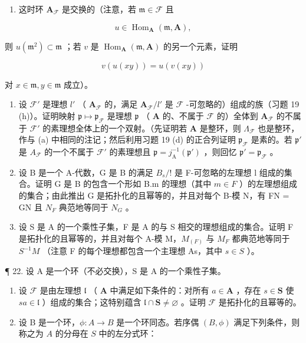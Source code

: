 \begin{enumerate}
\def\labelenumi{(\alph{enumi})}
\tightlist
\item
  这时环 \(\mathbf{A}_{\mathcal{F}}\) 是交换的（注意，若 \(\mathfrak{m} \in \mathcal{F}\) 且
\end{enumerate}

\[
u \in \operatorname{Hom} _ {\mathbf {A}} (\mathfrak {m}, \mathbf {A}),
\]

则 \(u(\mathfrak{m}^2) \subset \mathfrak{m}\) ；若 \(v\) 是 \(\operatorname{Hom}_{\mathbf{A}}(\mathfrak{m}, \mathbf{A})\) 的另一个元素，证明

\[
v (u (x y)) = u (v (x y))
\]

对 \(x \in \mathfrak{m}, y \in \mathfrak{m}\) 成立）。

\begin{enumerate}
\def\labelenumi{(\alph{enumi})}
\setcounter{enumi}{1}
\item
  设 \(\mathcal{F}'\) 是理想 \(l'\) （ \(\mathbf{A}_{\mathcal{F}}\) 的，满足 \(\mathbf{A}_{\mathcal{F}} / l'\) 是 \(\mathcal{F}\) -可忽略的）组成的族（习题 19 (h)）。证明映射 \(\mathfrak{p} \mapsto \mathfrak{p}_{\mathcal{F}}\) 是理想 \(\mathfrak{p}\) （ \(\mathbf{A}\) 的、不属于 \(\mathcal{F}\) 的）全体到 \(\mathbf{A}_{\mathcal{F}}\) 的不属于 \(\mathcal{F}'\) 的素理想全体上的一个双射。（先证明若 \(\mathbf{A}\) 是整环，则 \(\Lambda_{\mathcal{F}}\) 也是整环，作与 (a) 中相同的注记；然后利用习题 19 (d) 的正合列证明 \(\mathfrak{p}_{\mathcal{F}}\) 是素的。若 \(\mathfrak{p}'\) 是 \(A_{\mathcal{F}}\) 的一个不属于 \(\mathcal{F}'\) 的素理想且 \(\mathfrak{p} = j_{\mathrm{A}}^{-1}(\mathfrak{p}')\) ，则回忆 \(\mathfrak{p}' = \mathfrak{p}_{\mathcal{F}}\) 。
\item
  设 B 是一个 A-代数，G 是 B 的满足 \(B_{s}/!\) 是 F-可忽略的左理想 l 组成的集合。证明 G 是 B 的包含一个形如 B.m 的理想（其中 \(m \in F\) ）的左理想组成的集合；由此推出 G 是拓扑化的且幂等的，并且对每个 B-模 N，有 FN = GN 且 \(N_{F}\) 典范地等同于 \(N_{G}\) 。
\item
  设 S 是 A 的一个乘性子集，F 是 A 的与 S 相交的理想组成的集合。证明 F 是拓扑化的且幂等的，并且对每个 A-模 M，\(M_{(F)}\) 与 \(M_{F}\) 都典范地等同于 \(S^{-1}M\) （注意 F 的每个理想都包含一个主理想 As，其中 \(s \in S\) ）。
\end{enumerate}

¶ 22. 设 A 是一个环（不必交换），S 是 A 的一个乘性子集。

\begin{enumerate}
\def\labelenumi{(\alph{enumi})}
\item
  设 \(\mathcal{F}\) 是由左理想 \(\mathfrak{l}\) （ \(\mathbf{A}\) 中满足如下条件的：对所有 \(a\in \mathbf{A}\) ，存在 \(s\in \mathbf{S}\) 使 \(sa\in \mathfrak{l}\) ）组成的集合；这特别蕴含 \(\mathfrak{l}\cap \mathbf{S}\neq \varnothing\) 。证明 \(\mathcal{F}\) 是拓扑化的且幂等的。
\item
  设 B 是一个环，\(\phi: A \to B\) 是一个环同态。若序偶 \((B, \phi)\) 满足下列条件，则称之为 \(A\) 的分母在 \(S\) 中的左分式环：
\end{enumerate}

